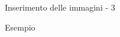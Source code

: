 \begin{frame}[fragile]{Inserimento delle immagini - 3}
	
\begin{esempio}{Esempio}
\end{esempio}

\end{frame}